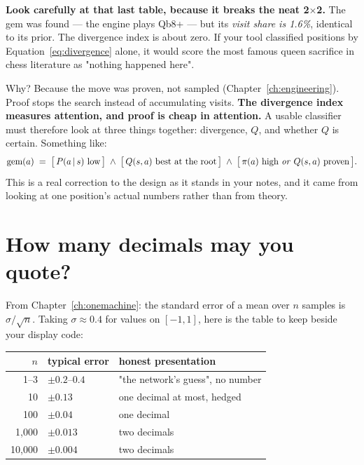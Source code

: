 \begin{pitfall}
\textbf{Look carefully at that last table, because it breaks the neat 2$\times$2.} The gem was
found --- the engine plays Qb8+ --- but its \emph{visit share is 1.6\%}, identical to its
prior. The divergence index is about zero. If your tool classified positions by
Equation~\eqref{eq:divergence} alone, it would score the most famous queen sacrifice in chess
literature as "nothing happened here".

Why? Because the move was proven, not sampled (Chapter~\ref{ch:engineering}). Proof stops the
search instead of accumulating visits. \textbf{The divergence index measures attention, and
proof is cheap in attention.} A usable classifier must therefore look at three things
together: divergence, $Q$, and whether $Q$ is certain. Something like:
\[
\text{gem}(a) \;=\; \bigl[\,P(a\,|\, s) \text{ low}\,\bigr] \;\wedge\;
\bigl[\,Q(s,a) \text{ best at the root}\,\bigr] \;\wedge\;
\bigl[\,\pi(a) \text{ high \emph{or} } Q(s,a) \text{ proven}\,\bigr].
\]
This is a real correction to the design as it stands in your notes, and it came from looking
at one position's actual numbers rather than from theory.
\end{pitfall}

\section{How many decimals may you quote?}

From Chapter~\ref{ch:onemachine}: the standard error of a mean over $n$ samples is
$\sigma/\sqrt{n}$. Taking $\sigma \approx 0.4$ for values on $[-1,1]$, here is the table to
keep beside your display code:

\begin{center}
\begin{tabular}{@{}rll@{}}
\toprule
$n$ & typical error & honest presentation \\
\midrule
1--3     & $\pm 0.2$--$0.4$ & "the network's guess", no number \\
10       & $\pm 0.13$ & one decimal at most, hedged \\
100      & $\pm 0.04$ & one decimal \\
1{,}000  & $\pm 0.013$ & two decimals \\
10{,}000 & $\pm 0.004$ & two decimals \\
\bottomrule
\end{tabular}
\end{center}

